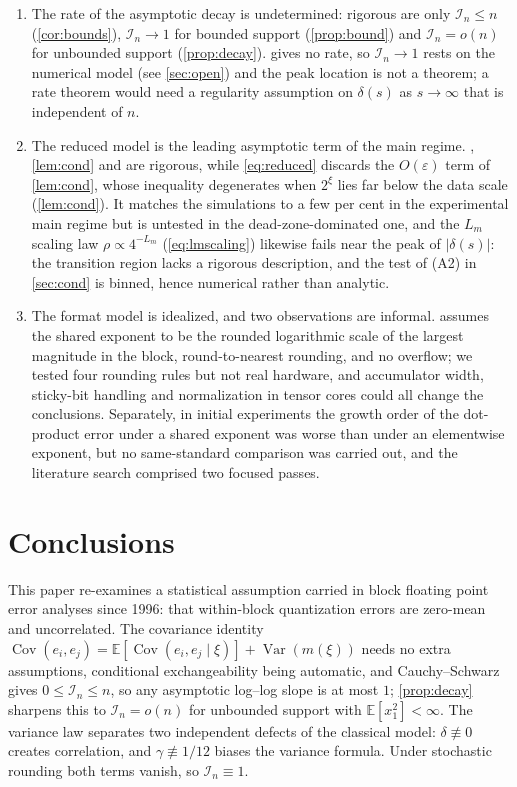 \documentclass[twocolumn,review,hidelinks,oneeqnum,onetabnum,onefignum,onethmnum]{siamart251216}
\begin{document}
\begin{enumerate}
\item The rate of the asymptotic decay is undetermined: rigorous are only
$\mathcal I_n\le n$ (\cref{cor:bounds}), $\mathcal I_n\to1$ for bounded support
(\cref{prop:bound}) and $\mathcal I_n=o(n)$ for unbounded support
(\cref{prop:decay}).  gives no rate, so $\mathcal I_n\to1$ rests on
the numerical model (see \cref{sec:open}) and the peak location is not a theorem; a
rate theorem would need a regularity assumption on $\delta(s)$ as $s\to\infty$ that
is independent of $n$.

\item The reduced model is the leading asymptotic term of the main regime.
, \cref{lem:cond} and
 are rigorous, while \cref{eq:reduced} discards the
$O(\varepsilon)$ term of \cref{lem:cond}, whose inequality degenerates when $2^\xi$
lies far below the data scale (\cref{lem:cond}). It matches the simulations to a
few per cent in the experimental main regime but is untested in the
dead-zone-dominated one, and the $L_m$ scaling law $\rho\propto4^{-L_m}$
(\cref{eq:lmscaling}) likewise fails near the peak of $|\delta(s)|$: the transition
region lacks a rigorous description, and the test of (A2) in \cref{sec:cond} is
binned, hence numerical rather than analytic.

\item The format model is idealized, and two observations are informal.
 assumes the shared exponent to be the rounded logarithmic scale of
the largest magnitude in the block, round-to-nearest rounding, and no overflow; we
tested four rounding rules but not real hardware, and accumulator width, sticky-bit
handling and normalization in tensor cores could all change the conclusions.
Separately, in initial experiments the growth order of the dot-product error under
a shared exponent was worse than under an elementwise exponent, but no
same-standard comparison was carried out, and the literature search comprised two
focused passes.
\end{enumerate}

\section{Conclusions}
\label{sec:conclusions}

This paper re-examines a statistical assumption carried in block floating point
error analyses since 1996: that within-block quantization errors are zero-mean and
uncorrelated. The covariance identity
$\operatorname{Cov}(e_i,e_j)=\mathbb{E}[\operatorname{Cov}(e_i,e_j\mid\xi)]
+\operatorname{Var}(m(\xi))$ needs no extra assumptions, conditional
exchangeability being automatic, and Cauchy--Schwarz gives
$0\le\mathcal I_n\le n$, so any asymptotic log--log slope is at most $1$;
\cref{prop:decay} sharpens this to $\mathcal I_n=o(n)$ for unbounded support with
$\mathbb{E}[x_1^2]<\infty$. The variance law separates two independent defects of
the classical model: $\delta\not\equiv0$ creates correlation, and
$\gamma\not\equiv1/12$ biases the variance formula. Under stochastic rounding
both terms vanish, so $\mathcal I_n\equiv1$.
\end{document}

